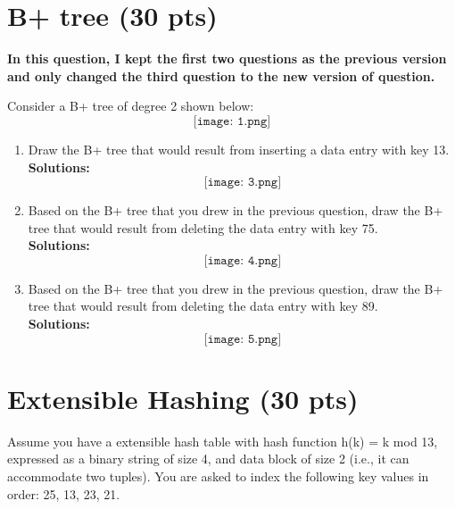 \documentclass[paper=a4, fontsize=11pt]{scrartcl}
\numberwithin{equation}{section}		%
\numberwithin{figure}{section}			%
\numberwithin{table}{section}				%
\begin{document}
	
	\section{B+ tree (30 pts)}
	
	\textbf{In this question, I kept the first two questions as the previous version and only changed the third question to the new version of question.}
	
	Consider a B+ tree of degree 2 shown below:
	\[
	\texttt{[image: 1.png]}
	\]
	
	\begin{enumerate}
		\item Draw the B+ tree that would result from inserting a data entry with key 13.\\
		\textbf{Solutions: }
		\[
		\texttt{[image: 3.png]}
		\]
		
		\item Based on the B+ tree that you drew in the previous question, draw the B+ tree that would result from deleting the data entry with key 75.\\
		\textbf{Solutions: }
		\[
		\texttt{[image: 4.png]}
		\]
		
		\item Based on the B+ tree that you drew in the previous question, draw the B+ tree that would result from deleting the data entry with key 89.\\
		\textbf{Solutions: }
		\[
		\texttt{[image: 5.png]}
		\]
		
	\end{enumerate}
	
	
	\section{Extensible Hashing (30 pts)}
	
	Assume you have a extensible hash table with hash function h(k) = k mod 13, expressed as a binary string of size 4, and data block of size 2 (i.e., it can accommodate two tuples). You are asked to index the following key values in order: 25, 13, 23, 21.
	
\end{document}
